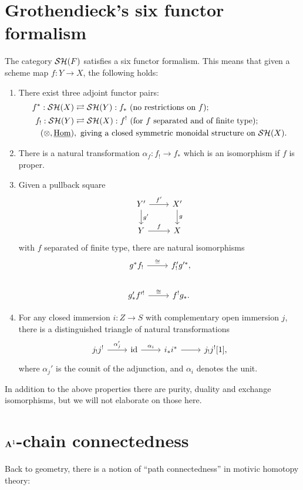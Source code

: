 \section{Grothendieck's six functor formalism}
The category $\mathcal{SH}(F)$ satisfies a six functor formalism. This means that given a scheme map $f:Y\to X$, the following holds:
\begin{enumerate}
\item There exist three adjoint functor pairs:
\begin{align*}
f^*:\mathcal{SH}(X)&\rightleftarrows\mathcal{SH}(Y):f_*\text{ (no restrictions on $f$);}\\
f_!:\mathcal{SH}(Y)&\rightleftarrows\mathcal{SH}(X):f^!\text{ (for $f$ separated and of finite type)};\\
(\otimes,\underline{\operatorname{Hom}})&, \text{ giving a closed symmetric monoidal structure on $\mathcal{SH}(X)$.}\end{align*}
\item There is a natural transformation $\alpha_f:f_!\to f_*$ which is an isomorphism if $f$ is proper.
\item Given a pullback square
\[\begin{tikzcd}
Y'\arrow{r}{f'}\arrow{d}{g'} & X'\arrow{d}{g}\\
Y\arrow{r}{f} & X\end{tikzcd}\]
with $f$ separated of finite type, there are natural isomorphisms
\[\begin{tikzcd}
g^*f_!\arrow{r}{\cong} & f_!'g'^*,\\
g'_*f'^!\arrow{r}{\cong} & f^!g_*.
\end{tikzcd}\]
\item For any closed immersion $i:Z\rightarrow S$ with complementary open immersion $j$, there is a distinguished triangle of natural transformations
\[\begin{tikzcd}j_!j^!\arrow{r}{\alpha_j'} & \id\arrow{r}{\alpha_i} & i_*i^*\arrow{r}  & j_!j^![1],
\end{tikzcd}\]where $\alpha_j'$ is the counit of the adjunction, and $\alpha_i$ denotes the unit.
\end{enumerate}
In addition to the above properties there are purity, duality and exchange isomorphisms, but we will not elaborate on those here.

\section{$\mathbf{A}^1$-chain connectedness}
Back to geometry, there is a notion of ``path connectedness'' in motivic homotopy theory:

